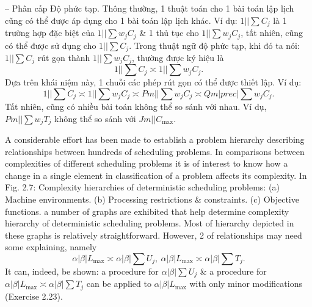 \documentclass{article}
\begin{document}
\begin{itemize}
\begin{itemize}
        -- {\sf Phân cấp Độ phức tạp.} Thông thường, 1 thuật toán cho 1 bài toán lập lịch cũng có thể được áp dụng cho 1 bài toán lập lịch khác. Ví dụ: $1||\sum C_j$ là 1 trường hợp đặc biệt của $1||\sum w_jC_j$ \& 1 thủ tục cho $1||\sum w_jC_j$, tất nhiên, cũng có thể được sử dụng cho $1||\sum C_j$. Trong thuật ngữ độ phức tạp, khi đó ta nói: $1||\sum C_j$ rút gọn thành $1||\sum w_jC_j$, thường được ký hiệu là
        \begin{equation*}
            1||\sum C_j\asymp1||\sum w_jC_j.
        \end{equation*}
        Dựa trên khái niệm này, 1 chuỗi các phép rút gọn có thể được thiết lập. Ví dụ:
        \begin{equation*}
            1||\sum C_j\asymp1||\sum w_jC_j\asymp Pm||\sum w_jC_j\asymp Qm|prec|\sum w_jC_j.
        \end{equation*}
        Tất nhiên, cũng có nhiều bài toán không thể so sánh với nhau. Ví dụ, $Pm||\sum w_jT_j$ không thể so sánh với $Jm||C_{\max}$.

        A considerable effort has been made to establish a problem hierarchy describing relationships between hundreds of scheduling problems. In comparisons between complexities of different scheduling problems it is of interest to know how a change in a single element in classification of a problem affects its complexity. In {\sf Fig. 2.7: Complexity hierarchies of deterministic scheduling problems: (a) Machine environments. (b) Processing restrictions \& constraints. (c) Objective functions.} a number of graphs are exhibited that help determine complexity hierarchy of deterministic scheduling problems. Most of hierarchy depicted in these graphs is relatively straightforward. However, 2 of relationships may need some explaining, namely
        \begin{equation*}
            \alpha|\beta|L_{\max}\asymp\alpha|\beta|\sum U_j,\ \alpha|\beta|L_{\max}\asymp\alpha|\beta|\sum T_j.
        \end{equation*}
        It can, indeed, be shown: a procedure for $\alpha|\beta|\sum U_j$ \& a procedure for $\alpha|\beta|L_{\max}\asymp\alpha|\beta|\sum T_j$ can be applied to $\alpha|\beta|L_{\max}$ with only minor modifications (Exercise 2.23).


\end{itemize}
\end{itemize}
\end{document}
